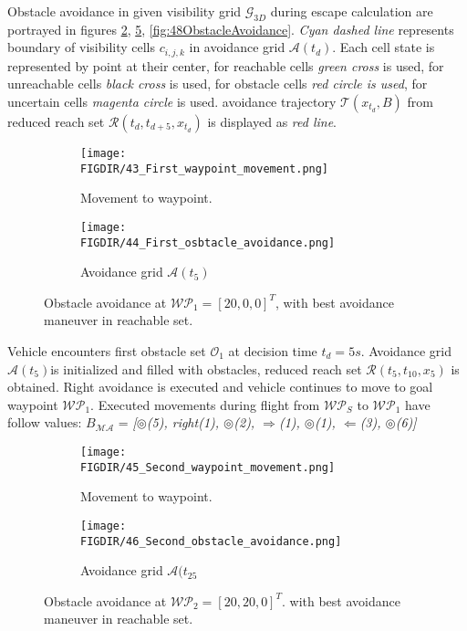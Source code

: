 Obstacle avoidance in given visibility grid $\mathscr{G}_{3D}$ during escape calculation are portrayed in figures \ref{fig:44ObstacleAvoidance}, \ref{fig:46ObstacleAvoidance}, \ref{fig:48ObstacleAvoidance}. \textit{Cyan dashed line} represents boundary of visibility cells $c_{i,j,k}$ in avoidance grid $\mathscr{A}(t_d)$. Each cell state is represented by point at their center, for reachable cells \textit{green cross} is used, for unreachable cells \textit{black cross} is used, for obstacle cells \textit{red circle is used}, for uncertain cells \textit{magenta circle} is used. avoidance trajectory $\mathscr{T}(x_{t_d},B)$ from reduced reach set $\mathscr{R}(t_d,t_{d+5},x_{t_d})$ is displayed as \textit{red line}.
\begin{figure}[H]
    \begin{subfigure}{0.5\textwidth}
    \texttt{[image: \\FIGDIR/43\_First\_waypoint\_movement.png]} 
    \caption{Movement to waypoint.}
    \label{fig:43firstwaypointMovement}
    \end{subfigure}
    \begin{subfigure}{0.5\textwidth}
    \texttt{[image: \\FIGDIR/44\_First\_osbtacle\_avoidance.png]}
    \caption{Avoidance grid $\mathscr{A}(t_5)$}
    \label{fig:44ObstacleAvoidance}
    \end{subfigure}
\caption{Obstacle avoidance at $\mathscr{WP}_1=[20,0,0]^T$, with best avoidance maneuver in reachable set.}
\label{fig:firstObstacleGrid}
\end{figure}
\noindent Vehicle encounters first obstacle set $\mathscr{O}_1$ at decision time $t_d=5s$. Avoidance grid $\mathscr{A}(t_5)$is initialized and filled with obstacles, reduced reach set $\mathscr{R}(t_5,t_{10},x_{5})$ is obtained. Right avoidance is executed and vehicle continues to move to goal waypoint $\mathscr{WP}_1$.
Executed movements during flight from $\mathscr{WP}_S$ to $\mathscr{WP}_1$ have follow values: $B_{\mathscr{MA}}$ = \textit{[$\circledcirc$(5), right(1), $\circledcirc$(2), $\Rightarrow$(1), $\circledcirc$(1), $\Leftarrow$(3), $\circledcirc$(6)]}
\begin{figure}[H]
    \begin{subfigure}{0.5\textwidth}
    \texttt{[image: \\FIGDIR/45\_Second\_waypoint\_movement.png]} 
    \caption{Movement to waypoint.}
    \label{fig:45secondwaypointMovement}
    \end{subfigure}
    \begin{subfigure}{0.5\textwidth}
    \texttt{[image: \\FIGDIR/46\_Second\_obstacle\_avoidance.png]}
    \caption{Avoidance grid $\mathscr{A}(t_{25}$}
    \label{fig:46ObstacleAvoidance}
    \end{subfigure}
\caption{Obstacle avoidance at $\mathscr{WP}_2=[20,20,0]^T$. with best avoidance maneuver in reachable set.}
\label{fig:secondObstacleGrid}
\end{figure}
